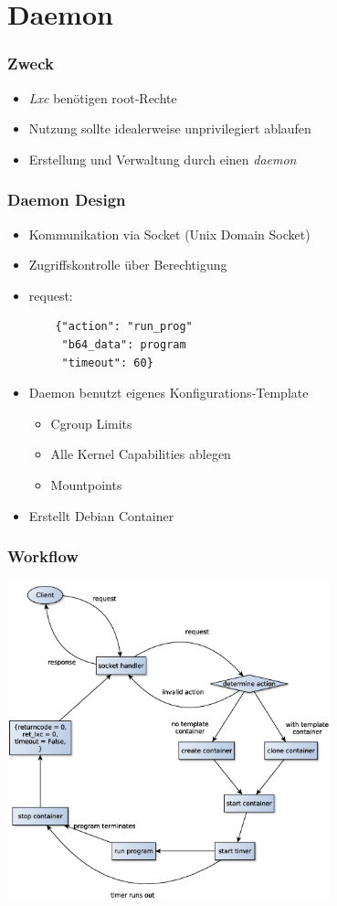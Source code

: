 \section{Daemon}


\begin{frame}
  \frametitle{Zweck}
  \begin{itemize}
   \item \textit{Lxc} benötigen root-Rechte
   \item Nutzung sollte idealerweise unprivilegiert ablaufen
   \item Erstellung und Verwaltung durch einen \textit{daemon}
  \end{itemize}
\end{frame}


\begin{frame}[fragile]
 \frametitle{Daemon Design}
 \begin{itemize}
  \item Kommunikation via Socket (Unix Domain Socket)
  \item Zugriffskontrolle über Berechtigung
  \item request:\\\begin{verbatim}
	{"action": "run_prog"
	 "b64_data": program
	 "timeout": 60}
        \end{verbatim}

  \item Daemon benutzt eigenes Konfigurations-Template
  \begin{itemize}
   \item Cgroup Limits
   \item Alle Kernel Capabilities ablegen
   \item Mountpoints
  \end{itemize}
  \item Erstellt Debian Container
 \end{itemize}
\end{frame}


\begin{frame}
 \frametitle{Workflow}
 \begin{center}
  \includegraphics[width=0.7\textwidth]{fig/workflow}
 \end{center}
\end{frame}

